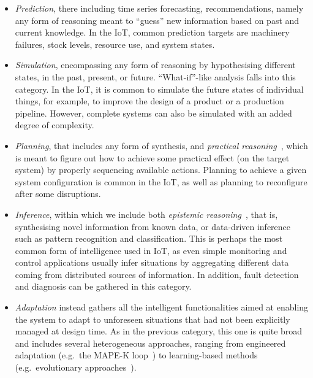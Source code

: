 \begin{itemize}
    \item \emph{Prediction}, there including time series forecasting, recommendations, namely any form of reasoning meant to ``guess'' new information based on past and current knowledge. 
    In the IoT, common prediction targets are machinery failures, stock levels, resource use, and system states. 
    \item \emph{Simulation}, encompassing any form of reasoning by hypothesising different states, in the past, present, or future. 
    ``What-if''-like analysis falls into this category. 
    In the IoT, it is common to simulate the future states of individual things, for example, to improve the design of a product or a production pipeline. 
    However, complete systems can also be simulated with an added degree of complexity.%
    \item \emph{Planning}, that includes any form of synthesis, and \emph{practical reasoning}~\cite{Bratman1988}, which is meant to figure out how to achieve some practical effect (on the target system) by properly sequencing available actions. 
    Planning to achieve a given system configuration is common in the IoT, as well as planning to reconfigure after some disruptions. 
    \item \emph{Inference}, within which we include both \emph{epistemic reasoning}~\cite{Meyer1995}, that is, synthesising novel information from known data, or data-driven inference such as pattern recognition and classification.
    This is perhaps the most common form of intelligence used in IoT, as even simple monitoring and control applications usually infer situations by aggregating different data coming from distributed sources of information. 
    In addition, fault detection and diagnosis can be gathered in this category. 
    \item \emph{Adaptation} instead gathers all the intelligent functionalities aimed at enabling the system to adapt to unforeseen situations that had not been explicitly managed at design time. 
    As in the previous category, this one is quite broad and includes several heterogeneous approaches, ranging from engineered adaptation (e.g.\ the MAPE-K loop~\cite{Oh2022}) to learning-based methods (e.g.\ evolutionary approaches~\cite{Eiben2005}). 

\end{itemize}
